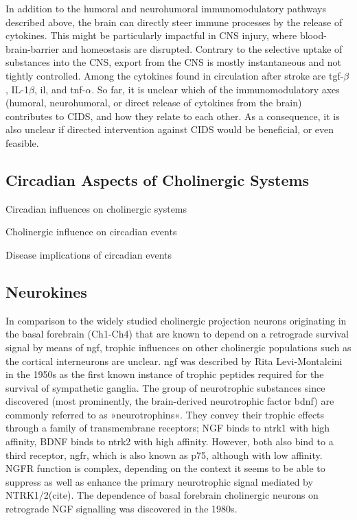 In addition to the humoral and neurohumoral immunomodulatory pathways described above, the brain can directly steer immune processes by the release of cytokines. This might be particularly impactful in CNS injury, where blood-brain-barrier and homeostasis are disrupted. Contrary to the selective uptake of substances into the CNS, export from the CNS is mostly instantaneous and not tightly controlled. Among the cytokines found in circulation after stroke are \ac{tgf}-$\beta$, IL-1$\beta$, \ac{il}, and \ac{tnf}-$\alpha$. So far, it is unclear which of the immunomodulatory axes (humoral, neurohumoral, or direct release of cytokines from the brain) contributes to CIDS, and how they relate to each other. As a consequence, it is also unclear if directed intervention against CIDS would be beneficial, or even feasible.

\subsection{Circadian Aspects of Cholinergic Systems}
\todo{}Circadian influences on cholinergic systems

Cholinergic influence on circadian events

Disease implications of circadian events

\subsection{Neurokines} \label{sec:intro:neurokine}
In comparison to the widely studied cholinergic projection neurons originating in the basal forebrain (Ch1-Ch4) that are known to depend on a retrograde survival signal by means of \ac{ngf}, trophic influences on other cholinergic populations such as the cortical interneurons are unclear.  \ac{ngf} was described by Rita Levi-Montalcini in the 1950s as the first known instance of trophic peptides required for the survival of sympathetic ganglia\cite{Levi-Montalcini1960}. The group of neurotrophic substances since discovered (most prominently, the brain-derived neurotrophic factor \acs{bdnf}) are commonly referred to as »neurotrophins«. They convey their trophic effects through a family of transmembrane receptors; NGF binds to \ac{ntrk1} with high affinity, BDNF binds to \ac{ntrk2} with high affinity. However, both also bind to a third receptor, \ac{ngfr}, which is also known as p75, although with low affinity. NGFR function is complex, depending on the context it seems to be able to suppress as well as enhance the primary neurotrophic signal mediated by NTRK1/2(cite). The dependence of basal forebrain cholinergic neurons on retrograde NGF signalling was discovered in the 1980s\cite{Hefti1986}.  

